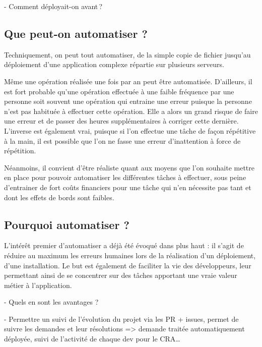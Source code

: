
- Comment déployait-on avant ?

\subsection*{Que peut-on automatiser ?}

Techniquement, on peut tout automatiser, de la simple copie de fichier jusqu'au déploiement d'une application complexe répartie sur plusieurs serveurs. 

Même une opération réalisée une fois par an peut être automatisée. D'ailleurs, il est fort probable qu'une opération effectuée à une faible fréquence par une personne soit souvent une opération qui entraine une erreur puisque la personne n'est pas habituée à effectuer cette opération. Elle a alors un grand risque de faire une erreur et de passer des heures supplémentaires à corriger cette dernière. L'inverse est également vrai, puisque si l'on effectue une tâche de façon répétitive à la main, il est possible que l'on ne fasse une erreur d'inattention à force de répétition. 

Néanmoins, il convient d'être réaliste quant aux moyens que l'on souhaite mettre en place pour pouvoir automatiser les différentes tâches à effectuer, sous peine d'entrainer de fort coûts financiers pour une tâche qui n'en nécessite pas tant et dont les effets de bords sont faibles.


\subsection*{Pourquoi automatiser ?}

L'intérêt premier d'automatiser a déjà été évoqué dans plus haut : il s'agit de réduire au maximum les erreurs humaines lors de la réalisation d'un déploiement, d'une installation. Le but est également de faciliter la vie des développeurs, leur permettant ainsi de se concentrer sur des tâches apportant une vraie valeur métier à l'application.


- Quels en sont les avantages ?

- Permettre un suivi de l'évolution du projet via les PR + issues, permet de suivre les demandes et leur résolutions => demande traitée automatiquement déployée, suivi de l'activité de chaque dev pour le CRA\ldots

